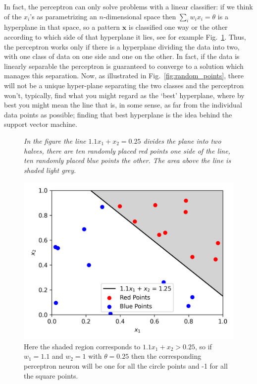 \documentclass[12pt]{article}
\begin{document}
In fact, the perceptron can only solve problems with a linear
classifier: if we think of the $x_i$'s as parametrizing an
$n$-dimensional space then $\sum_iw_ix_i=\theta$ is a hyperplane in
that space, so a pattern $\textbf{x}$ is classified one way or the
other according to which side of that hyperplane it lies, see for example Fig.~\ref{fig:linear_classifier}. Thus, the
perceptron works only if there is a hyperplane dividing the data into
two, with one class of data on one side and one on the other. In fact,
if the data is linearly separable the perceptron is guaranteed to
converge to a solution which manages this separation. Now, as
illustrated in Fig.~\ref{fig:random_points}, there will not be a unique
hyper-plane separating the two classes and the perceptron won't,
typically, find what you might regard as the \lq{}best\rq{}
hyperplane, where by best you might mean the line that is, in some
sense, as far from the individual data points as possible; finding
that best hyperplane is the idea behind the support vector machine.


\begin{figure}
               {{\textsl{In the figure the line $1.1x_1+x_2=0.25$ divides the plane into two halves, there are ten randomly placed red points one side of the line, ten randomly placed blue points the other. The area above the line is shaded light grey.}}}
                            {
\begin{center}  
  \includegraphics{linear_classifier.png}
\end{center}
}
\caption{Here the shaded region corresponds to $1.1x_1+x_2>0.25$, so
  if $w_1=1.1$ and $w_2=1$ with $\theta=0.25$ then the corresponding
  perceptron neuron will be one for all the circle points and -1 for
  all the square points.\label{fig:linear_classifier}}
\end{figure}
\end{document}
